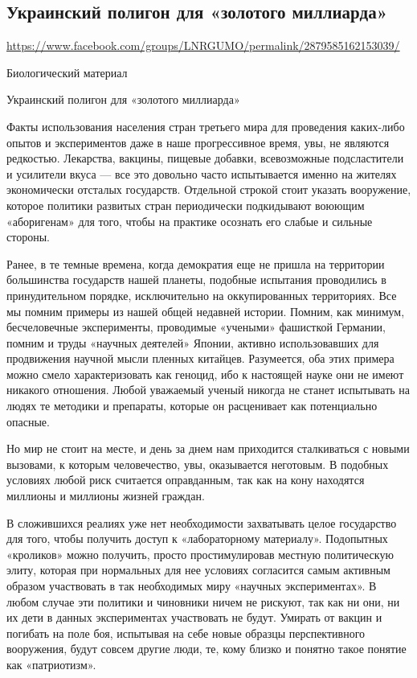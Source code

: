  
 

\subsection{Украинский полигон для «золотого миллиарда»}
\label{sec:26_07_2020.fb.lnr.3}
\url{https://www.facebook.com/groups/LNRGUMO/permalink/2879585162153039/}


Биологический материал

Украинский полигон для «золотого миллиарда»

Факты использования населения стран третьего мира для проведения каких-либо
опытов и экспериментов даже в наше прогрессивное время, увы, не являются
редкостью. Лекарства, вакцины, пищевые добавки, всевозможные подсластители и
усилители вкуса --- все это довольно часто испытывается именно на жителях
экономически отсталых государств. Отдельной строкой стоит указать вооружение,
которое политики развитых стран периодически подкидывают воюющим «аборигенам»
для того, чтобы на практике осознать его слабые и сильные стороны.

Ранее, в те темные времена, когда демократия еще не пришла на территории
большинства государств нашей планеты, подобные испытания проводились в
принудительном порядке, исключительно на оккупированных территориях. Все мы
помним примеры из нашей общей недавней истории. Помним, как минимум,
бесчеловечные эксперименты, проводимые «учеными» фашисткой Германии, помним и
труды «научных деятелей» Японии, активно использовавших для продвижения научной
мысли пленных китайцев. Разумеется, оба этих примера можно смело
характеризовать как геноцид, ибо к настоящей науке они не имеют никакого
отношения. Любой уважаемый ученый никогда не станет испытывать на людях те
методики и препараты, которые он расценивает как потенциально опасные.

Но мир не стоит на месте, и день за днем нам приходится сталкиваться с новыми
вызовами, к которым человечество, увы, оказывается неготовым. В подобных
условиях любой риск считается оправданным, так как на кону находятся миллионы и
миллионы жизней граждан.

В сложившихся реалиях уже нет необходимости захватывать целое государство для
того, чтобы получить доступ к «лабораторному материалу». Подопытных «кроликов»
можно получить, просто простимулировав местную политическую элиту, которая при
нормальных для нее условиях согласится самым активным образом участвовать в так
необходимых миру «научных экспериментах». В любом случае эти политики и
чиновники ничем не рискуют, так как ни они, ни их дети в данных экспериментах
участвовать не будут. Умирать от вакцин и погибать на поле боя, испытывая на
себе новые образцы перспективного вооружения, будут совсем другие люди, те,
кому близко и понятно такое понятие как «патриотизм».


